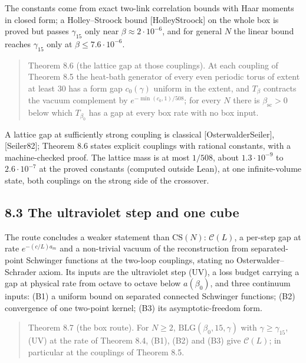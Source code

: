 \documentclass[10pt,letterpaper,twocolumn]{article}
\begin{document}
The constants come from exact two-link correlation bounds with Haar moments in closed form; a Holley--Stroock bound {[}HolleyStroock{]} on the whole box is proved but passes \(\gamma_{15}\) only near \(\beta\approx2\cdot10^{-6}\), and for general \(N\) the linear bound reaches \(\gamma_{15}\) only at \(\beta\le7.6\cdot10^{-6}\).

\begin{quote}
Theorem 8.6 (the lattice gap at those couplings). At each coupling of Theorem 8.5 the heat-bath generator of every even periodic torus of extent at least \(30\) has a form gap \(c_0(\gamma)\) uniform in the extent, and \(T_\beta\) contracts the vacuum complement by \(e^{-\min(c_0,1)/508}\); for every \(N\) there is \(\beta_{\mathrm{sc}}>0\) below which \(T_{\beta_0}\) has a gap at every box rate with no box input.
\end{quote}

A lattice gap at sufficiently strong coupling is classical {[}OsterwalderSeiler{]}, {[}Seiler82{]}; Theorem 8.6 states explicit couplings with rational constants, with a machine-checked proof. The lattice mass is at most \(1/508\), about \(1.3\cdot10^{-9}\) to \(2.6\cdot10^{-7}\) at the proved constants (computed outside Lean), at one infinite-volume state, both couplings on the strong side of the crossover.

\subsection{8.3 The ultraviolet step and one cube}\label{83-the-ultraviolet-step-and-one-cube}

The route concludes a weaker statement than \(\mathrm{CS}(N)\): \(\mathcal C(L)\), a per-step gap at rate \(e^{-(c/L)a_m}\) and a non-trivial vacuum of the reconstruction from separated-point Schwinger functions at the two-loop couplings, stating no Osterwalder--Schrader axiom. Its inputs are the ultraviolet step (UV), a loss budget carrying a gap at physical rate from octave to octave below \(a(\beta_0)\), and three continuum inputs: (B1) a uniform bound on separated connected Schwinger functions; (B2) convergence of one two-point kernel; (B3) its asymptotic-freedom form.

\begin{quote}
Theorem 8.7 (the box route). For \(N\ge2\), \(\mathrm{BLG}(\beta_0,15,\gamma)\) with \(\gamma\ge\gamma_{15}\), (UV) at the rate of Theorem 8.4, (B1), (B2) and (B3) give \(\mathcal C(L)\); in particular at the couplings of Theorem 8.5.
\end{quote}
\end{document}
